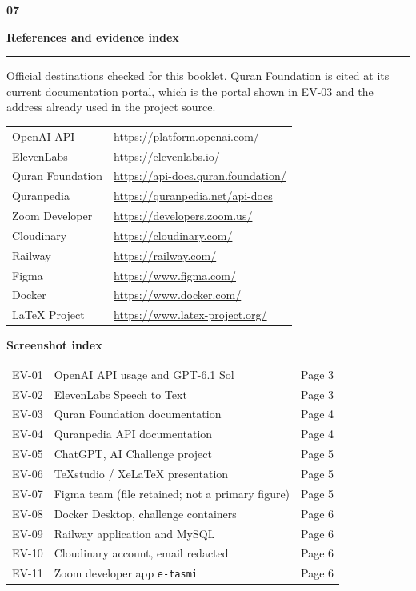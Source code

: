 \documentclass[10.5pt]{article}
\newcommand{\secno}[2]{%
  {\sffamily\bfseries\fontsize{10}{12}\selectfont\color{teal}#1}\par\vspace{0.4mm}%
  {\sffamily\bfseries\fontsize{15.5}{18}\selectfont\color{navy}#2}\par\vspace{1mm}%
  {\color{teal}\rule{\textwidth}{0.7pt}}\par\vspace{1.6mm}%
}
\newcommand{\hlabel}[1]{{\sffamily\bfseries\color{navy}#1}}
\begin{document}
\clearpage
\secno{07}{References and evidence index}

Official destinations checked for this booklet. Quran Foundation is cited at its current documentation portal, which is the portal shown in EV-03 and the address already used in the project source.

{\fontsize{9.5}{12.6}\selectfont
\begin{tabular}{@{}l l@{}}
OpenAI API & \url{https://platform.openai.com/} \\
ElevenLabs & \url{https://elevenlabs.io/} \\
Quran Foundation & \url{https://api-docs.quran.foundation/} \\
Quranpedia & \url{https://quranpedia.net/api-docs} \\
Zoom Developer & \url{https://developers.zoom.us/} \\
Cloudinary & \url{https://cloudinary.com/} \\
Railway & \url{https://railway.com/} \\
Figma & \url{https://www.figma.com/} \\
Docker & \url{https://www.docker.com/} \\
LaTeX Project & \url{https://www.latex-project.org/} \\
\end{tabular}}

\vspace{1.5mm}
\hlabel{Screenshot index}\par
{\fontsize{9}{12}\selectfont
\begin{tabular}{@{}l l l@{}}
EV-01 & OpenAI API usage and GPT-6.1 Sol & Page 3 \\
EV-02 & ElevenLabs Speech to Text & Page 3 \\
EV-03 & Quran Foundation documentation & Page 4 \\
EV-04 & Quranpedia API documentation & Page 4 \\
EV-05 & ChatGPT, AI Challenge project & Page 5 \\
EV-06 & TeXstudio / XeLaTeX presentation & Page 5 \\
EV-07 & Figma team (file retained; not a primary figure) & Page 5 \\
EV-08 & Docker Desktop, challenge containers & Page 6 \\
EV-09 & Railway application and MySQL & Page 6 \\
EV-10 & Cloudinary account, email redacted & Page 6 \\
EV-11 & Zoom developer app \texttt{e-tasmi} & Page 6 \\
\end{tabular}}
\end{document}
